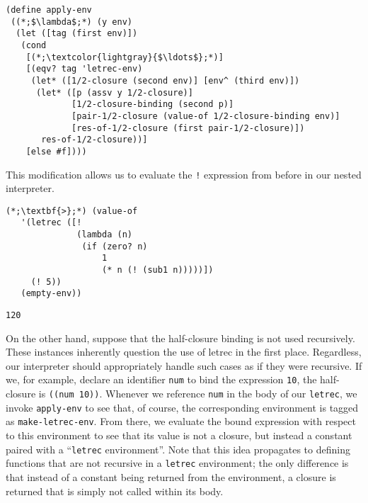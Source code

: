 \begin{cl}[]{}
\begin{lstlisting}[language=MyScheme]
(define apply-env
 ((*;$\lambda$;*) (y env)
  (let ([tag (first env)])
   (cond
    [(*;\textcolor{lightgray}{$\ldots$};*)]
    [(eqv? tag 'letrec-env)
     (let* ([1/2-closure (second env)] [env^ (third env)])
      (let* ([p (assv y 1/2-closure)] 
             [1/2-closure-binding (second p)] 
             [pair-1/2-closure (value-of 1/2-closure-binding env)]
             [res-of-1/2-closure (first pair-1/2-closure)])
       res-of-1/2-closure))]
    [else #f])))
\end{lstlisting}
\end{cl}

This modification allows us to evaluate the \texttt{!} expression from before in our nested interpreter.

\begin{clo}[]{}
\begin{lstlisting}[language=MyNLNSOutput]
(*;\textbf{>};*) (value-of
   '(letrec ([! 
              (lambda (n)
               (if (zero? n) 
                   1 
                   (* n (! (sub1 n)))))])
     (! 5))
   (empty-env))
\end{lstlisting}
\tcblower
\begin{lstlisting}[language=MyOutput]
120
\end{lstlisting}
\end{clo}

On the other hand, suppose that the half-closure binding is not used recursively. These instances inherently question the use of letrec in the first place. Regardless, our interpreter should appropriately handle such cases as if they were recursive. If we, for example, declare an identifier \texttt{num} to bind the expression \texttt{10}, the half-closure is \texttt{((num 10))}. Whenever we reference \texttt{num} in the body of our \texttt{letrec}, we invoke \texttt{apply-env} to see that, of course, the corresponding environment is tagged as \texttt{make-letrec-env}. From there, we evaluate the bound expression with respect to this environment to see that its value is not a closure, but instead a constant paired with a ``\texttt{letrec} environment''. Note that this idea propagates to defining functions that are not recursive in a \texttt{letrec} environment; the only difference is that instead of a constant being returned from the environment, a closure is returned that is simply not called within its body.

